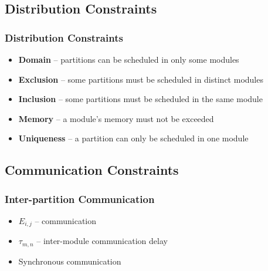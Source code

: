 \documentclass[english, frametitlelogo, mainlogoleft, handout]{beamer}
\begin{document}
\subsection{Distribution Constraints}

\begin{frame}
    \frametitle{Distribution Constraints}

    \begin{itemize}
        \item \textbf{Domain}  -- partitions can be scheduled in only some modules
        \item \textbf{Exclusion} -- some partitions must be scheduled in distinct modules
        \item \textbf{Inclusion} -- some partitions must be scheduled in the same module
        \item \textbf{Memory} -- a module's memory must not be exceeded
        \item \textbf{Uniqueness} -- a partition can only be scheduled in one module
    \end{itemize}
\end{frame}

\subsection{Communication Constraints}

\begin{frame}
    \frametitle{Inter-partition Communication}

    \begin{itemize}
        \item $E_{i,j}$ -- communication 
        \item $τ_{m,n}$ -- inter-module communication delay
        \item Synchronous communication
    \end{itemize}



\end{frame}
\end{document}
